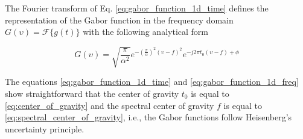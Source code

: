 \documentclass[journal]{IEEEtran}
\begin{document}
The Fourier transform of Eq. \eqref{eq:gabor_function_1d_time} defines the representation of the Gabor function in the frequency domain $G(\upsilon) = \mathcal{F}\{g(t)\}$ with the following analytical form

\begin{equation}\label{eq:gabor_function_1d_freq}
    G(\upsilon) =  \sqrt{\frac{\pi}{\alpha^2}} e ^{-\left(\frac{\pi}{\alpha}\right) ^{2} (\upsilon-f)^2} e ^{-j 2 \pi t_0 (\upsilon-f) + \phi}
\end{equation}

The equations \eqref{eq:gabor_function_1d_time} and \eqref{eq:gabor_function_1d_freq} show straightforward that the center of gravity $t_0$ is equal to \eqref{eq:center_of_gravity} and the spectral center of gravity $f$ is equal to \eqref{eq:spectral_center_of_gravity}, i.e., the Gabor functions follow Heisenberg's uncertainty principle.   
\end{document}
